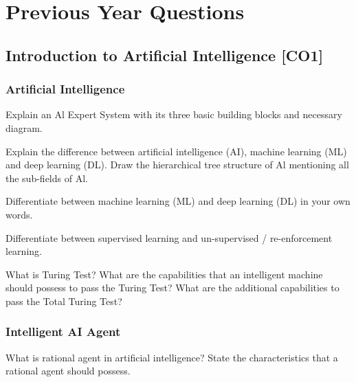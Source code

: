 \chapter{Previous Year Questions}

\section*{Introduction to Artificial Intelligence [CO1]}

\subsection*{Artificial Intelligence}

\begin{Question}[4][CO1 \rgbGray{/} S-24]
Explain an Al Expert System with its three basic building blocks and necessary diagram.
\end{Question}

\begin{Question}[4][CO1 \rgbGray{/} S-23]
   Explain the difference between artificial intelligence (AI), machine learning (ML) and deep learning (DL). Draw the hierarchical tree structure of Al mentioning all the sub-fields of Al.
\end{Question}

\vspace{1em}
\begin{Question}[4][F-22 \rgbGray{/} S-22]
   Differentiate between machine learning (ML) and deep learning (DL) in your own words.

   Differentiate between supervised learning and un-supervised / re-enforcement learning.
\end{Question}

\vspace{1em}
\begin{Question}[4][S-21 \rgbGray{/} F-23]
   What is Turing Test? What are the capabilities that an intelligent machine should possess to pass the Turing Test? What are the additional capabilities to pass the Total Turing Test?
\end{Question}



\subsection*{Intelligent AI Agent}

\begin{Question}[2][F-22]
   What is rational agent in artificial intelligence? State the characteristics that a rational agent should possess.
\end{Question}

